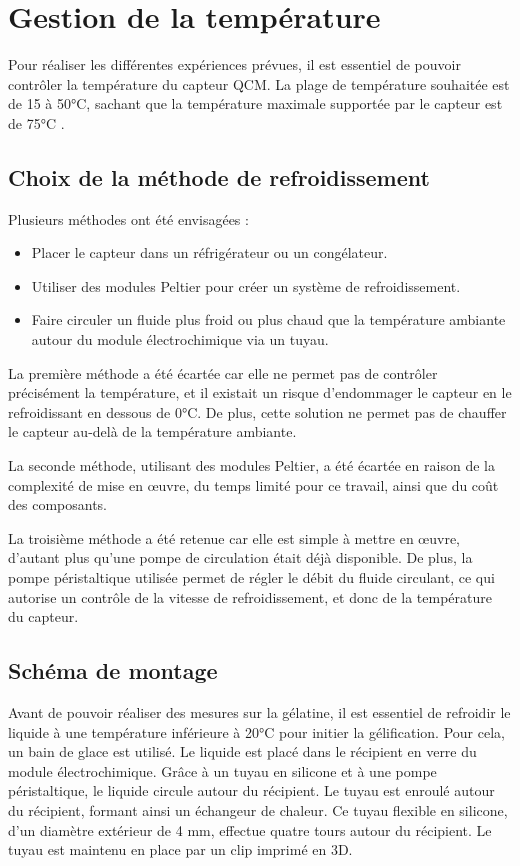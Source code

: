 \chapter{Gestion de la température}

Pour réaliser les différentes expériences prévues, il est essentiel de pouvoir contrôler la température du capteur QCM.  
La plage de température souhaitée est de 15 à 50°C, sachant que la température maximale supportée par le capteur est de 75°C \cite{manual-openqcmQ1}.

\section{Choix de la méthode de refroidissement}

Plusieurs méthodes ont été envisagées :
\begin{itemize}[label=\textbullet]
    \item Placer le capteur dans un réfrigérateur ou un congélateur.
    \item Utiliser des modules Peltier pour créer un système de refroidissement.
    \item Faire circuler un fluide plus froid ou plus chaud que la température ambiante autour du module électrochimique via un tuyau.
\end{itemize}

La première méthode a été écartée car elle ne permet pas de contrôler précisément la température, et il existait un risque d’endommager le capteur en le refroidissant en dessous de 0°C. De plus, cette solution ne permet pas de chauffer le capteur au-delà de la température ambiante.

La seconde méthode, utilisant des modules Peltier, a été écartée en raison de la complexité de mise en œuvre, du temps limité pour ce travail, ainsi que du coût des composants.

La troisième méthode a été retenue car elle est simple à mettre en œuvre, d’autant plus qu’une pompe de circulation était déjà disponible. De plus, la pompe péristaltique utilisée permet de régler le débit du fluide circulant, ce qui autorise un contrôle de la vitesse de refroidissement, et donc de la température du capteur.

\section{Schéma de montage}

Avant de pouvoir réaliser des mesures sur la gélatine, il est essentiel de refroidir le liquide à une température inférieure à 20°C pour initier la gélification.  
Pour cela, un bain de glace est utilisé. Le liquide est placé dans le récipient en verre du module électrochimique.  
Grâce à un tuyau en silicone et à une pompe péristaltique, le liquide circule autour du récipient.  
Le tuyau est enroulé autour du récipient, formant ainsi un échangeur de chaleur.  
Ce tuyau flexible en silicone, d’un diamètre extérieur de 4 mm, effectue quatre tours autour du récipient.  
Le tuyau est maintenu en place par un clip imprimé en 3D.


